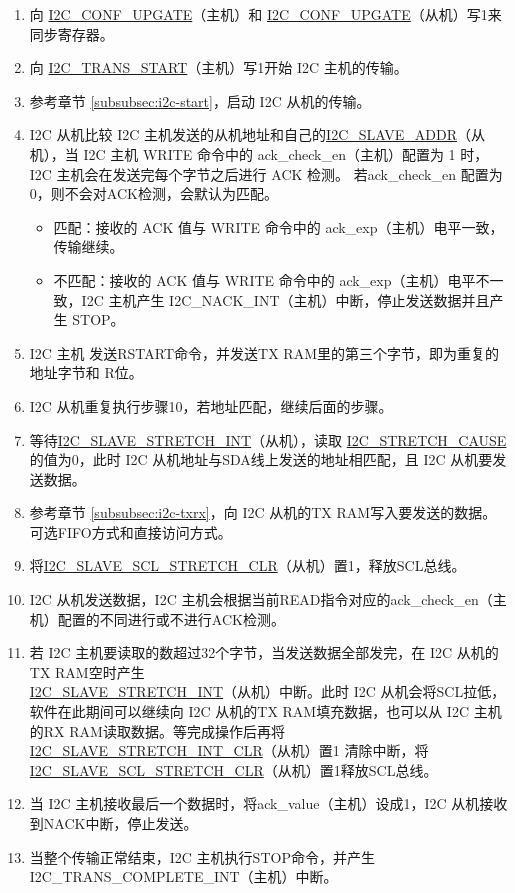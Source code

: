\documentclass[main\_\_CN.tex]{subfiles}
\begin{document}
\begin{enumerate}
\item 向 \hyperref[fielddesc:I2CCONFUPGATE]{I2C\_CONF\_UPGATE}（主机）和 \hyperref[fielddesc:I2CCONFUPGATE]{I2C\_CONF\_UPGATE}（从机）写1来同步寄存器。
\item 向 \hyperref[fielddesc:I2CTRANSSTART]{I2C\_TRANS\_START}（主机）写1开始 I2C 主机的传输。
\item 参考章节 \ref{subsubsec:i2c-start}，启动 I2C 从机的传输。
\item I2C 从机比较 I2C 主机发送的从机地址和自己的\hyperref[fielddesc:I2CSLAVEADDR]{I2C\_SLAVE\_ADDR}（从机），当 I2C 主机 WRITE 命令中的 ack\_check\_en（主机）配置为 1 时，I2C 主机会在发送完每个字节之后进行 ACK 检测。 若ack\_check\_en 配置为 0，则不会对ACK检测，会默认为匹配。
\begin{itemize}
\item 匹配：接收的 ACK 值与 WRITE 命令中的 ack\_exp（主机）电平一致，传输继续。
\item 不匹配：接收的 ACK 值与 WRITE 命令中的 ack\_exp（主机）电平不一致，I2C 主机产生 I2C\_NACK\_INT（主机）中断，停止发送数据并且产生 STOP。
\end{itemize}

\item I2C 主机 发送RSTART命令，并发送TX RAM里的第三个字节，即为重复的地址字节和 R位。
\item I2C 从机重复执行步骤10，若地址匹配，继续后面的步骤。

\item 等待\hyperref[int:i2c-slave-stretch]{I2C\_SLAVE\_STRETCH\_INT}（从机），读取 \hyperref[fielddesc:I2CSTRETCHCAUSE]{I2C\_STRETCH\_CAUSE} 的值为0，此时 I2C 从机地址与SDA线上发送的地址相匹配，且 I2C 从机要发送数据。
\item 参考章节 \ref{subsubsec:i2c-txrx}，向 I2C 从机的TX RAM写入要发送的数据。可选FIFO方式和直接访问方式。
\item 将\hyperref[fielddesc:I2CSLAVESCLSTRETCHCLR]{I2C\_SLAVE\_SCL\_STRETCH\_CLR}（从机）置1，释放SCL总线。


\item I2C 从机发送数据，I2C 主机会根据当前READ指令对应的ack\_check\_en（主机）配置的不同进行或不进行ACK检测。
\item 若 I2C 主机要读取的数超过32个字节，当发送数据全部发完，在 I2C 从机的TX RAM空时产生 \\\hyperref[int:i2c-slave-stretch]{I2C\_SLAVE\_STRETCH\_INT}（从机）中断。此时 I2C 从机会将SCL拉低，软件在此期间可以继续向 I2C 从机的TX RAM填充数据，也可以从 I2C 主机的RX RAM读取数据。等完成操作后再将 \hyperref[fielddesc:I2CSLAVESTRETCHINTCLR]{I2C\_SLAVE\_STRETCH\_INT\_CLR}（从机）置1 清除中断，将 \hyperref[fielddesc:I2CSLAVESCLSTRETCHCLR]{I2C\_SLAVE\_SCL\_STRETCH\_CLR}（从机）置1释放SCL总线。

\item 当 I2C 主机接收最后一个数据时，将ack\_value（主机）设成1，I2C 从机接收到NACK中断，停止发送。

\item 当整个传输正常结束，I2C 主机执行STOP命令，并产生 I2C\_TRANS\_COMPLETE\_INT（主机）中断。
\end{enumerate}
\end{document}
